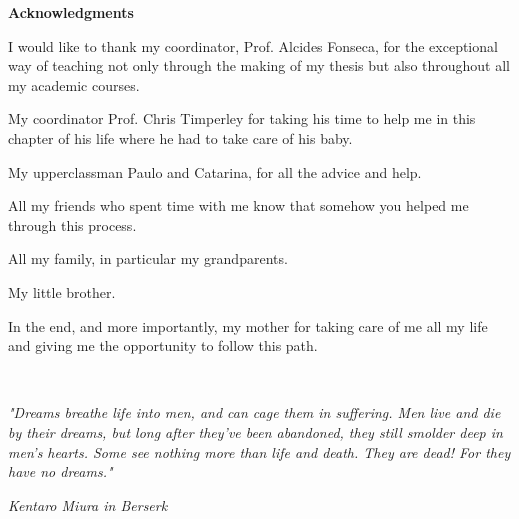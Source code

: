 
\pagestyle{plain}

\vspace*{2cm}
\begin{center}
\Large \bf Acknowledgments
\end{center}
\vspace*{1cm} \setlength{\baselineskip}{0.6cm}

I would like to thank my coordinator, Prof. Alcides Fonseca, for the exceptional way of teaching not only through the making of my thesis but also throughout all my academic courses. 

My coordinator Prof. Chris Timperley for taking his time to help me in this chapter of his life where he had to take care of his baby. 

My upperclassman Paulo and Catarina, for all the advice and help. 

All my friends who spent time with me know that somehow you helped me through this process. 

All my family, in particular my grandparents. 

My little brother. 

In the end, and more importantly, my mother for taking care of me all my life and giving me the opportunity to follow this path.

\cleardoublepage~\vfill

\begin{flushright}\textit{"Dreams breathe life into men, and can cage them in suffering. Men live and die by their dreams, but long after they've been abandoned, they still smolder deep in men's hearts. Some see nothing more than life and death. They are dead! For they have no dreams."}\end{flushright}
\begin{flushright}\textit{Kentaro Miura in Berserk}\end{flushright}

